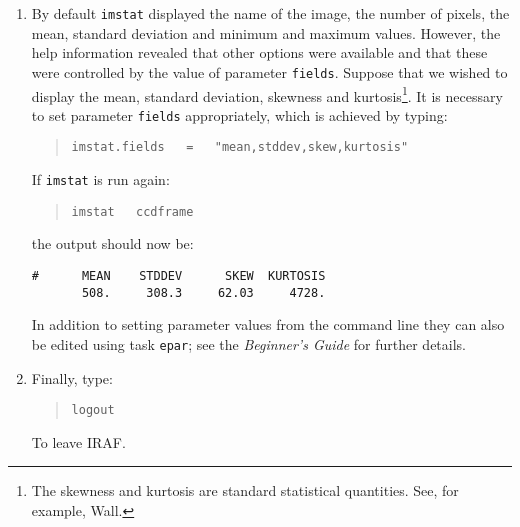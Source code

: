 \documentclass[twoside,11pt]{article}
\begin{document}
\begin{enumerate}
   The output should be something like:

  \begin{verbatim}
       images = "ccdframe"      Images
      (fields = "image,npix,mean,stddev,min,max") Fields to be printed
       (lower = INDEF)          Lower cutoff for pixel values
       (upper = INDEF)          Upper cutoff for pixel values
    (binwidth = 0.1)            Bin width of histogram in sigma
      (format = yes)            Format output and print column labels?
        (mode = "ql")           
  \end{verbatim}

   The parameters enclosed in brackets are hidden (in this case this
   is all of them except {\tt images}).

  \item By default {\tt imstat} displayed the name of the image, the
   number of pixels, the mean, standard deviation and minimum and
   maximum values.  However, the help information revealed that other
   options were available and that these were controlled by the value
   of parameter {\tt fields}.  Suppose that we wished to display the
   mean, standard deviation, skewness and kurtosis\footnote{The
   skewness and kurtosis are standard statistical quantities.  See,
   for example, Wall\cite{WALL79}.}.  It is necessary to set parameter
   {\tt fields} appropriately, which is achieved by typing:

  \begin{quote}
   {\tt imstat.fields ~ = ~ "mean,stddev,skew,kurtosis"}
  \end{quote}

   If {\tt imstat} is run again:

  \begin{quote}
   {\tt imstat ~ ccdframe}
  \end{quote}

   the output should now be:

  \begin{verbatim}
#      MEAN    STDDEV      SKEW  KURTOSIS
       508.     308.3     62.03     4728.
  \end{verbatim}

   In addition to setting parameter values from the command line they
   can also be edited using task {\tt epar}; see the {\it Beginner's
   Guide}\/\cite{BARNES93} for further details.

  \item Finally, type:

  \begin{quote}
   {\tt logout}
  \end{quote}

   To leave IRAF.

\end{enumerate}
\end{document}
